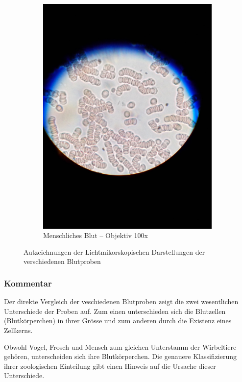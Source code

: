 \begin{figure}[h!]
\begin{subfigure}[b]{0.45\textwidth}
		\includegraphics[angle=270, width=1\textwidth]{../images/02_own_blood.jpg}
		\caption{Menschliches Blut -- Objektiv 100x}
	\end{subfigure}
	\caption{Autzeichnungen der Lichtmikorskopischen Darstellungen der
		verschiedenen Blutproben}
\end{figure}

\subsubsection{Kommentar}
Der direkte Vergleich der veschiedenen Blutproben zeigt die zwei wesentlichen
Unterschiede der Proben auf. Zum einen unterschieden sich die Blutzellen
(Blutkörperchen) in ihrer Grösse und zum anderen durch die Existenz eines
Zellkerns.

Obwohl Vogel, Frosch und Mensch zum gleichen Unterstamm der Wirbeltiere
gehören, unterscheiden sich ihre Blutkörperchen. Die genauere Klassifizierung
ihrer zoologischen Einteilung gibt einen Hinweis auf die Ursache dieser
Unterschiede. 

